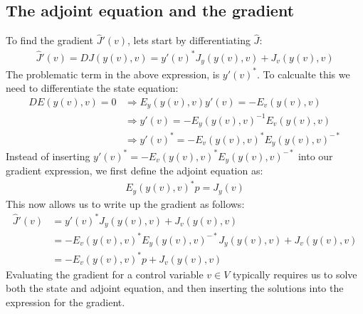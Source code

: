 \subsection{The adjoint equation and the gradient}
To find the gradient $\hat{J}'(v)$, lets start by differentiating $\hat J$:
\begin{align*}
\hat{J}'(v) = DJ(y(v),v) = y'(v)^*J_y(y(v),v) + J_v(y(v),v)
\end{align*}
The problematic term in the above expression, is $y'(v)^*$. To calcualte this we need to differentiate the state equation:
\begin{align*}
DE(y(v),v)=0 &\Rightarrow E_y(y(v),v)y'(v)=-E_v(y(v),v) \\ &\Rightarrow y'(v)=-E_y(y(v),v)^{-1}E_v(y(v),v) \\ &\Rightarrow y'(v)^* = -E_v(y(v),v)^*E_y(y(v),v)^{-*}
\end{align*}
Instead of inserting $y'(v)^* = -E_v(y(v),v)^*E_y(y(v),v)^{-*}$ into our gradient expression, we first define the adjoint equation as:
\begin{align}
E_y(y(v),v)^{*}p=J_y(v) \label{general adjoint}
\end{align}
This now allows us to write up the gradient as follows:
\begin{align}
\hat{J}'(v)&= y'(v)^*J_y(y(v),v) + J_v(y(v),v)\\
&=-E_v(y(v),v)^*E_y(y(v),v)^{-*}J_y(y(v),v) + J_v(y(v),v) \\
&= -E_v(y(v),v)^*p +J_v(y(v),v) \label{gradient}
\end{align}
Evaluating the gradient for a control variable $v\in V$ typically requires us to solve both the state and adjoint equation, and then inserting the solutions into the expression for the gradient.
